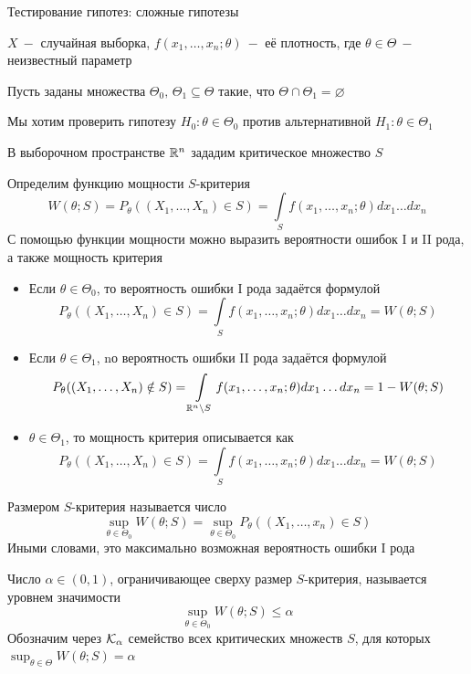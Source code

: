 \documentclass[a4paper,11pt]{article}
\begin{document}
\setcounter{mainta}{13}
\setcounter{subta}{0}

\setcounter{mainle}{13}
\setcounter{suble}{0}
\begin{center}
    \huge Тестирование гипотез: сложные гипотезы
\end{center}
$X\ -$ случайная выборка, $f(x_1,\dots,x_n;\theta)\ -$ её плотность, где $\theta\in\Theta\ -$ неизвестный параметр

Пусть заданы множества $\Theta_0,\,\Theta_1\subseteq\Theta$ такие, что $\Theta\cap\Theta_1 = \varnothing$

Мы хотим проверить гипотезу $H_0:\theta\in\Theta_0$ против альтернативной $H_1:\theta\in\Theta_1$

В выборочном пространстве $\mathbb{R}^n$ зададим критическое множество $S$

Определим функцию мощности $S$-критерия
\[W(\theta; S) = P_\theta\left((X_1,\dots,X_n)\in S\right) = \int\limits_Sf(x_1,\dots,x_n;\theta)dx_1\dots dx_n\]
С помощью функции мощности можно выразить вероятности ошибок I и II рода, а также мощность критерия

\begin{itemize}
    \item Если $\theta\in\Theta_0$, то вероятность ошибки I рода задаётся формулой
    \[P_\theta((X_1,\dots,X_n)\in S) = \int\limits_Sf(x_1,\dots,x_n;\theta)dx_1\dots dx_n = W(\theta; S)\]
    \item Если $\theta\in\Theta_1$, nо вероятность ошибки II рода задаётся формулой
    \[P_\theta((X_1,\dots,X_n)\notin S) = \int\limits_{\mathbb{R}^n\setminus S}f(x_1,\dots,x_n;\theta)dx_1\dots dx_n = 1 - W(\theta; S)\]
    \item $\theta\in\Theta_1$, то мощность критерия описывается как
    \[P_\theta((X_1,\dots,X_n)\in S) = \int\limits_Sf(x_1,\dots,x_n;\theta)dx_1\dots dx_n = W(\theta; S)\]
\end{itemize}
Размером $S$-критерия называется число
\[\sup_{\theta\in\Theta_0} W(\theta;S) = \sup_{\theta\in\Theta_0}P_\theta((X_1,\dots,x_n)\in S)\]
Иными словами, это максимально возможная вероятность ошибки I рода

Число $\alpha\in(0,1)$, ограничивающее сверху размер $S$-критерия, называется уровнем значимости
\[\sup_{\theta\in\Theta_0}W(\theta; S) \leq \alpha\]
Обозначим через $\mathcal{K}_\alpha$ семейство всех критических множеств $S$, для которых $\displaystyle\sup_{\theta\in\Theta}W(\theta; S) = \alpha$
\end{document}
